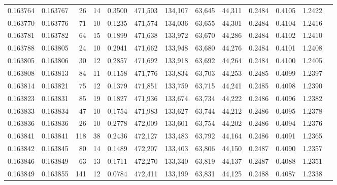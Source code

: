 \begin{tabular}{rrrrrrrrrrrrr}
0.163764 & 0.163767 &    26 &  14 &                                     0.3500 & 471,503 & 134,107 &  63,645 &  44,311 & 0.2484 & 0.4105 & 1.2422 \\
0.163770 & 0.163776 &    71 &  10 &                                     0.1235 & 471,574 & 134,036 &  63,655 &  44,301 & 0.2484 & 0.4104 & 1.2416 \\
0.163781 & 0.163782 &    64 &  15 &                                     0.1899 & 471,638 & 133,972 &  63,670 &  44,286 & 0.2484 & 0.4102 & 1.2410 \\
0.163788 & 0.163805 &    24 &  10 &                                     0.2941 & 471,662 & 133,948 &  63,680 &  44,276 & 0.2484 & 0.4101 & 1.2408 \\
0.163805 & 0.163806 &    30 &  12 &                                     0.2857 & 471,692 & 133,918 &  63,692 &  44,264 & 0.2484 & 0.4100 & 1.2405 \\
0.163808 & 0.163813 &    84 &  11 &                                     0.1158 & 471,776 & 133,834 &  63,703 &  44,253 & 0.2485 & 0.4099 & 1.2397 \\
0.163814 & 0.163821 &    75 &  12 &                                     0.1379 & 471,851 & 133,759 &  63,715 &  44,241 & 0.2485 & 0.4098 & 1.2390 \\
0.163823 & 0.163831 &    85 &  19 &                                     0.1827 & 471,936 & 133,674 &  63,734 &  44,222 & 0.2486 & 0.4096 & 1.2382 \\
0.163833 & 0.163834 &    47 &  10 &                                     0.1754 & 471,983 & 133,627 &  63,744 &  44,212 & 0.2486 & 0.4095 & 1.2378 \\
0.163836 & 0.163836 &    26 &  10 &                                     0.2778 & 472,009 & 133,601 &  63,754 &  44,202 & 0.2486 & 0.4094 & 1.2376 \\
0.163841 & 0.163841 &   118 &  38 &                                     0.2436 & 472,127 & 133,483 &  63,792 &  44,164 & 0.2486 & 0.4091 & 1.2365 \\
0.163842 & 0.163845 &    80 &  14 &                                     0.1489 & 472,207 & 133,403 &  63,806 &  44,150 & 0.2487 & 0.4090 & 1.2357 \\
0.163846 & 0.163849 &    63 &  13 &                                     0.1711 & 472,270 & 133,340 &  63,819 &  44,137 & 0.2487 & 0.4088 & 1.2351 \\
0.163849 & 0.163855 &   141 &  12 &                                     0.0784 & 472,411 & 133,199 &  63,831 &  44,125 & 0.2488 & 0.4087 & 1.2338 \\

\end{tabular}
